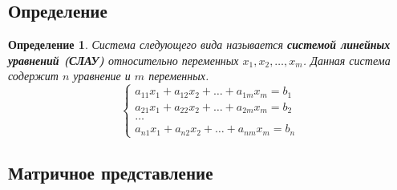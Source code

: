 \documentclass[]{article}
\newtheorem{definition}{Определение}
\begin{document}
\subsection{Определение}
\begin{definition}
Система следующего вида называется \textbf{системой линейных уравнений (СЛАУ)} относительно переменных $x_1,x_2,\ldots,x_m$. Данная система содержит $n$ уравнение и $m$ переменных.
\begin{equation*}
\begin{cases}
	a_{11}x_1 + a_{12}x_2 + \ldots + a_{1m}x_m=b_1
	\\
	a_{21}x_1 + a_{22}x_2 + \ldots + a_{2m}x_m=b_2
	\\
	\ldots
	\\
	a_{n1}x_1 + a_{n2}x_2 + \ldots + a_{nm}x_m=b_n
\end{cases}
\end{equation*}
\end{definition}
\subsection{Матричное представление}
\end{document}

